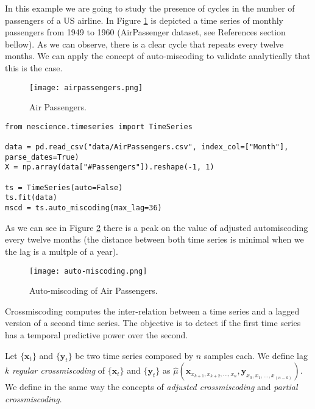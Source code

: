 \begin{example}
In this example we are going to study the presence of cycles in the number of passengers of a US airline. In Figure \ref{figure:air_passengers} is depicted a time series of monthly passengers from 1949 to 1960 (AirPassenger dataset, see References section bellow). As we can observe, there is a clear cycle that repeats every twelve months. We can apply the concept of auto-miscoding to validate analytically that this is the case.

\begin{figure}[h]
\centering
\texttt{[image: airpassengers.png]}
\caption{Air Passengers.}
\label{figure:air_passengers}
\end{figure}

\begin{sourcecode}
{\scriptsize \begin{verbatim}
from nescience.timeseries import TimeSeries

data = pd.read_csv("data/AirPassengers.csv", index_col=["Month"], parse_dates=True)
X = np.array(data["#Passengers"]).reshape(-1, 1)

ts = TimeSeries(auto=False)
ts.fit(data)
mscd = ts.auto_miscoding(max_lag=36)
\end{verbatim}}
\end{sourcecode}

As we can see in Figure \ref{figure:auto-miscoding} there is a peak on the value of adjusted automiscoding every twelve months (the distance between both time series is minimal when we the lag is a multple of a year).

\begin{figure}[h]
\centering
\texttt{[image: auto-miscoding.png]}
\caption{Auto-miscoding of Air Passengers.}
\label{figure:auto-miscoding}
\end{figure}

\end{example}

Crossmiscoding computes the inter-relation between a time series and a lagged version of a second time series. The objective is to detect if the first time series has a temporal predictive power over the second.

\begin{definition}
Let $\{\mathbf{x}_t\}$ and $\{\mathbf{y}_t\}$ be two time series composed by $n$ samples each. We define lag $k$ \emph{regular crossmiscoding} of $\{\mathbf{x}_t\}$ and $\{\mathbf{y}_t\}$ as $\hat\mu(\mathbf{x}_{x_{k+1}, x_{k+2}, \ldots, x_n}, \mathbf{y}_{x_0, x_1, \ldots, x_{(n-k)}})$. We define in the same way the concepts of \emph{adjusted crossmiscoding} and \emph{partial crossmiscoding}.
\end{definition}

